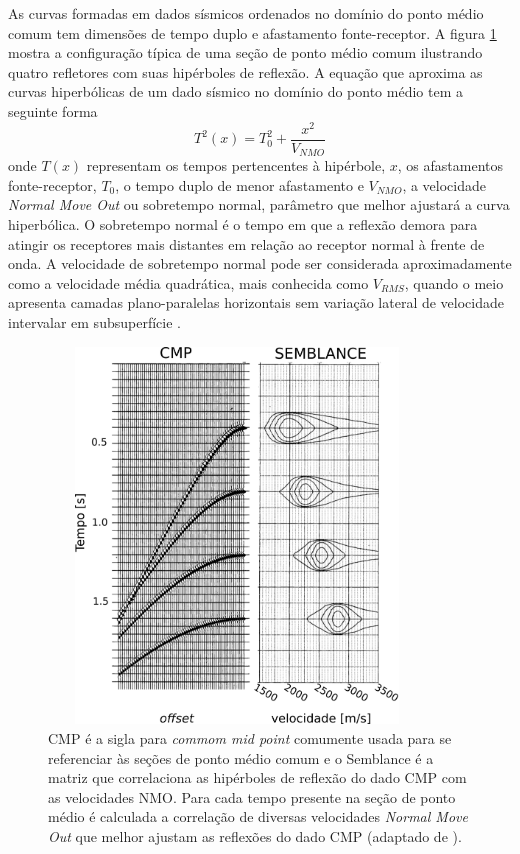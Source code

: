 \documentclass[
	12pt,				%
	openright,			%
	oneside,			%
	a4paper,			%
	english,			%
	brazil				%
	]{abntex2}
\begin{document}
    As curvas formadas em dados sísmicos ordenados no domínio do ponto médio comum tem dimensões de tempo duplo e afastamento fonte-receptor. A figura \ref{cmpGather} mostra a configuração típica de uma seção de ponto médio comum ilustrando quatro refletores com suas hipérboles de reflexão. A equação que aproxima as curvas hiperbólicas de um dado sísmico no domínio do ponto médio tem a seguinte forma
%    
    \begin{equation}
        T^2(x) = T_0^2 + \dfrac{x^2}{V_{NMO}}
        \label{velan}
    \end{equation}
%    
    \noindent onde $T(x)$ representam os tempos pertencentes à hipérbole, $x$, os afastamentos fonte-receptor, $T_0$, o tempo duplo de menor afastamento e $V_{NMO}$, a velocidade \textit{Normal Move Out} ou sobretempo normal, parâmetro que melhor ajustará a curva hiperbólica. O sobretempo normal é o tempo em que a reflexão demora para atingir os receptores mais distantes em relação ao receptor normal à frente de onda. A velocidade de sobretempo normal pode ser considerada aproximadamente como a velocidade média quadrática, mais conhecida como $V_{RMS}$, quando o meio apresenta camadas plano-paralelas horizontais sem variação lateral de velocidade intervalar em subsuperfície \cite{yilmaz2001seismic}. 

    \begin{figure}[htp!]
        \centering
        \includegraphics[width=10cm,height=10cm]{../imagens/cmpSemblance.png}
        \caption{CMP é a sigla para \textit{commom mid point} comumente usada para se referenciar às seções de ponto médio comum e o Semblance é a matriz que correlaciona as hipérboles de reflexão do dado CMP com as velocidades NMO. Para cada tempo presente na seção de ponto médio é calculada a correlação de diversas velocidades \textit{Normal Move Out} que melhor ajustam as reflexões do dado CMP (adaptado de ).}
        \label{cmpGather}
    \end{figure}
    
\end{document}
